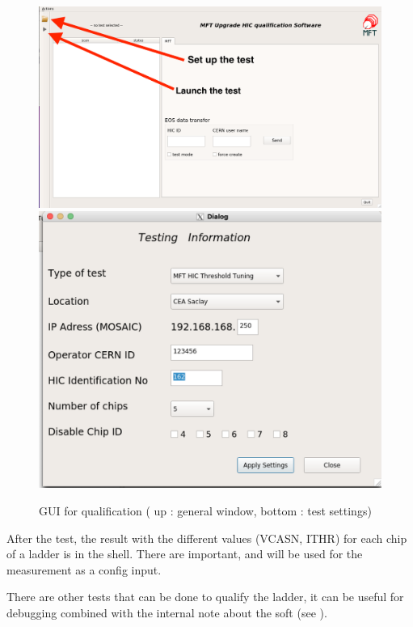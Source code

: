 \documentclass[12pt,oneside,a4]{article}
\begin{document}
\begin{figure}[h]
        \centering
        \includegraphics[scale =0.2]{figures/Interface_example_1.png}
        \includegraphics[scale =0.3]{figures/Interface_example_2.png}
        \caption{GUI for qualification ( up : general window, bottom : test settings)}
        \label{fig:9}
\end{figure}

After the test, the result with the different values (VCASN, ITHR) for each chip of a ladder is in the shell. There are important, and will be used for the measurement as a config input.

There are other tests that can be done to qualify the ladder, it can be useful for debugging combined with the internal note about the soft (see \cite{Note}).
\end{document}
